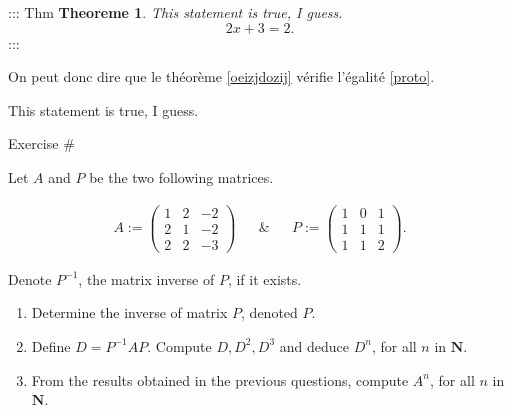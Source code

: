 \documentclass[
]{article}
\author{}
\date{}
\begin{document}
::: Thm \textbf{Theoreme 1}. \emph{This statement is true, I guess.
\[\label{proto}
 2x +3 = 2.\]} :::

On peut donc dire que le théorème
\protect\hyperlink{oeizjdozij}{{[}oeizjdozij{]}} vérifie l'égalité
\protect\hyperlink{proto}{{[}proto{]}}.

This statement is true, I guess.

Exercise \#

Let \(A\) and \(P\) be the two following matrices.

\[\begin{aligned}
&A:=  \begin{pmatrix}1 & 2 & -2\\2 & 1 & -2\\2 & 2 & -3\end{pmatrix}&
& \& & 
&P:=  \begin{pmatrix}1 & 0 & 1\\1 & 1 & 1\\1 & 1 & 2\end{pmatrix}.&
\end{aligned}\]

Denote \(P^{-1}\), the matrix inverse of \(P\), if it exists.

\begin{enumerate}
\def\labelenumi{\arabic{enumi}.}
\item
  Determine the inverse of matrix \(P\), denoted \(P\).
\item
  Define \(D=P^{-1}AP\). Compute \(D, D^{2}, D^{3}\) and deduce
  \(D^{n}\), for all \(n\) in \({\mathbf{N}}\).
\item
  From the results obtained in the previous questions, compute
  \(A^{n}\), for all \(n\) in \({\mathbf{N}}\).
\end{enumerate}
\end{document}

